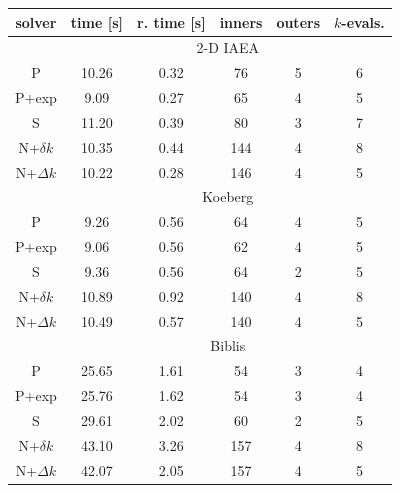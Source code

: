 \begin{table}[!] 

 \begin{center} 
 
 \begin{threeparttable}
 \begin{tabular}{cccccc} 
 \toprule 
  solver & time [s] & r. time [s]\tnote{f} & inners & outers & $k$-evals. \\
 \midrule 
 &  \multicolumn{5}{c}{2-D IAEA} \\ 
 \midrule 
    P\tnote{a}        &     10.26 &      0.32 &           76 &            5 &            6 \\ 
    P+exp\tnote{b} &      9.09 &      0.27 &           65 &            4 &            5 \\ 
    S\tnote{c} &     11.20 &      0.39 &           80 &            3 &            7 \\ 
  N+$\delta k$\tnote{d} &     10.35 &      0.44 &          144 &            4 &            8 \\ 
  N+$\Delta k$\tnote{e} &     10.22 &      0.28 &          146 &            4 &            5 \\ 
 \midrule 
 &  \multicolumn{5}{c}{Koeberg} \\ 
 \midrule 
        P &      9.26 &      0.56 &           64 &            4 &            5 \\ 
    P+exp &      9.06 &      0.56 &           62 &            4 &            5 \\ 
    S &      9.36 &      0.56 &           64 &            2 &            5 \\ 
  N+$\delta k$ &     10.89 &      0.92 &          140 &            4 &            8 \\ 
  N+$\Delta k$ &     10.49 &      0.57 &          140 &            4 &            5 \\ 
 \midrule 
 &  \multicolumn{5}{c}{Biblis} \\ 
 \midrule 
    P &     25.65 &      1.61 &           54 &            3 &            4 \\ 
    P+exp &     25.76 &      1.62 &           54 &            3 &            4 \\ 
    S &     29.61 &      2.02 &           60 &            2 &            5 \\ 
  N+$\delta k$ &     43.10 &      3.26 &          157 &            4 &            8 \\ 
  N+$\Delta k$ &     42.07 &      2.05 &          157 &            4 &            5 \\ 

\end{tabular}
\end{threeparttable}
\end{center}
\end{table}
